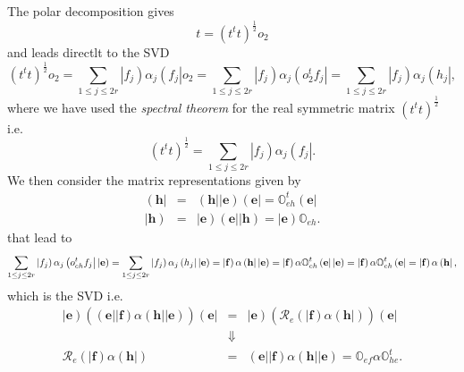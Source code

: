 \documentclass[aps,preprint]{revtex4}
\begin{document}
The polar decomposition gives%
\begin{equation}
t=\left( t^{t}t\right) ^{\frac{1}{2}}o_{2}
\end{equation}%
and leads directlt to the SVD%
\begin{equation}
\left( t^{t}t\right) ^{\frac{1}{2}}o_{2}=\sum_{1\leq j\leq 2r}\left\vert
f_{j}\right) \alpha _{j}\left( f_{j}\right\vert o_{2}=\sum_{1\leq j\leq
2r}\left\vert f_{j}\right) \alpha _{j}\left( o_{2}^{t}f_{j}\right\vert
=\sum_{1\leq j\leq 2r}\left\vert f_{j}\right) \alpha _{j}\left(
h_{j}\right\vert ,
\end{equation}%
where we have used the \emph{spectral theorem} for the real symmetric matrix 
$\left( t^{t}t\right) ^{\frac{1}{2}}$ i.e.%
\begin{equation}
\left( t^{t}t\right) ^{\frac{1}{2}}=\sum_{1\leq j\leq 2r}\left\vert
f_{j}\right) \alpha _{j}\left( f_{j}\right\vert .
\end{equation}%
We then consider the matrix representations given by 
\begin{eqnarray}
\left( \mathbf{h}\right\vert &=&\left( \mathbf{h}\right\vert \left\vert 
\mathbf{e}\right) \left( \mathbf{e}\right\vert =\mathbb{O}_{eh}^{t}\left( 
\mathbf{e}\right\vert \\
\left\vert \mathbf{h}\right) &=&\left\vert \mathbf{e}\right) \left( \mathbf{e%
}\right\vert \left\vert \mathbf{h}\right) =\left\vert \mathbf{e}\right) 
\mathbb{O}_{eh}.
\end{eqnarray}%
that lead to 
\begin{equation}
\sum_{1\leq j\leq 2r}\left\vert f_{j}\right) \alpha _{j}\left(
o_{eh}^{t}f_{j}\right\vert \left\vert \mathbf{e}\right) =\sum_{1\leq j\leq
2r}\left\vert f_{j}\right) \alpha _{j}\left( h_{j}\right\vert \left\vert 
\mathbf{e}\right) =\left\vert \mathbf{f}\right) \mathbb{\alpha }\left( 
\mathbf{h}\right\vert \left\vert \mathbf{e}\right) =\left\vert \mathbf{f}%
\right) \mathbb{\alpha O}_{eh}^{t}\left( \mathbf{e}\right\vert \left\vert 
\mathbf{e}\right) =\left\vert \mathbf{f}\right) \mathbb{\alpha O}%
_{eh}^{t}\left( \mathbf{e}\right\vert =\left\vert \mathbf{f}\right) \mathbb{%
\alpha }\left( \mathbf{h}\right\vert ,
\end{equation}%
which is the SVD i.e.%
\begin{eqnarray}
\left\vert \mathbf{e}\right) \left( \overset{}{\left( \mathbf{e}\right\vert
\left\vert \mathbf{f}\right) \mathbb{\alpha }\left( \mathbf{h}\right\vert
\left\vert \mathbf{e}\right) }\right) \left( \mathbf{e}\right\vert
&=&\left\vert \mathbf{e}\right) \left( \overset{}{\mathcal{R}_{e}\left(
\left\vert \mathbf{f}\right) \mathbb{\alpha }\left( \mathbf{h}\right\vert
\right) }\right) \left( \mathbf{e}\right\vert \\
&\Downarrow & \\
\mathcal{R}_{e}\left( \left\vert \mathbf{f}\right) \mathbb{\alpha }\left( 
\mathbf{h}\right\vert \right) &=&\left( \mathbf{e}\right\vert \left\vert 
\mathbf{f}\right) \mathbb{\alpha }\left( \mathbf{h}\right\vert \left\vert 
\mathbf{e}\right) =\mathbb{O}_{ef}\mathbb{\alpha O}_{he}^{t}.
\end{eqnarray}
\end{document}
